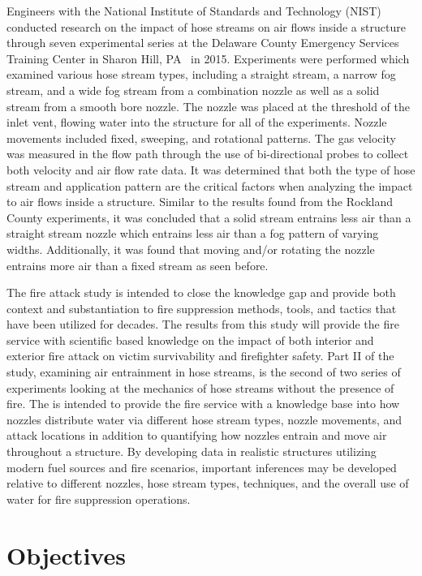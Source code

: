 \documentclass[12pt,oneside]{book}
\begin{document}
Engineers with the National Institute of Standards and Technology (NIST) conducted research on the impact of hose streams on air flows inside a structure through seven experimental series at the Delaware County Emergency Services Training Center in Sharon Hill, PA~\cite{NISTHoseStreams} in 2015. Experiments were performed which examined various hose stream types, including a straight stream, a narrow fog stream, and a wide fog stream from a combination nozzle as well as a solid stream from a smooth bore nozzle. The nozzle was placed at the threshold of the inlet vent, flowing water into the structure for all of the experiments. Nozzle movements included fixed, sweeping, and rotational patterns. The gas velocity was measured in the flow path through the use of bi-directional probes to collect both velocity and air flow rate data. It was determined that both the type of hose stream and application pattern are the critical factors when analyzing the impact to air flows inside a structure. Similar to the results found from the Rockland County experiments, it was concluded that a solid stream entrains less air than a straight stream nozzle which entrains less air than a fog pattern of varying widths. Additionally, it was found that moving and/or rotating the nozzle entrains more air than a fixed stream as seen before. 

The fire attack study is intended to close the knowledge gap and provide both context and substantiation to fire suppression methods, tools, and tactics that have been utilized for decades. The results from this study will provide the fire service with scientific based knowledge on the impact of both interior and exterior fire attack on victim survivability and firefighter safety. Part II of the study, examining air entrainment in hose streams, is the second of two series of experiments looking at the mechanics of hose streams without the presence of fire. The is intended to provide the fire service with a knowledge base into how nozzles distribute water via different hose stream types, nozzle movements, and attack locations in addition to quantifying how nozzles entrain and move air throughout a structure. By developing data in realistic structures utilizing modern fuel sources and fire scenarios, important inferences may be developed relative to different nozzles, hose stream types, techniques, and the overall use of water for fire suppression operations.

\chapter{Objectives}
\end{document}
